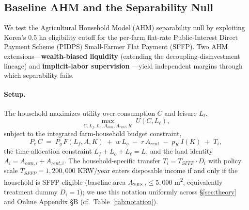 \documentclass[12pt, a4paper]{article}
\begin{document}
\subsection{Baseline AHM and the Separability Null}
\label{sec:ahm-baseline}

We test the \citet{SinghSquireStrauss1986_ahm} Agricultural Household Model (AHM) separability null by exploiting Korea's 0.5 ha eligibility cutoff for the per-farm flat-rate Public-Interest Direct Payment Scheme (PIDPS) Small-Farmer Flat Payment (SFFP). Two AHM extensions---\textbf{wealth-biased liquidity} \citep{CarterOlinto2003_liquidity} (extending the \citealp{Kazukauskas2013_disinvestment} decoupling-disinvestment lineage) and \textbf{implicit-labor supervision} \citep{EswaranKotwal1986_supervision}---yield independent margins through which separability fails.

\paragraph{Setup.} The household maximizes utility over consumption $C$ and leisure $L_\ell$,
\begin{equation}
\max_{C, L_f, L_o, A_{own}, A_{rent}, K} \; U(C, L_\ell),
\label{eq:ahm-objective}
\end{equation}
subject to the integrated farm-household budget constraint,
\begin{equation}
P_c\, C \;=\; P_q\, F(L_f, A, K) \;+\; w\, L_o \;-\; r\, A_{rent} \;-\; p_K\, I(K) \;+\; T_i,
\label{eq:ahm-budget}
\end{equation}
the time-allocation constraint $L_f + L_o + L_\ell = \bar L$, and the land identity $A_i = A_{own,i} + A_{rent,i}$. The household-specific transfer $T_i = T_{SFFP} \cdot D_i$ with policy scale $T_{SFFP} = 1{,}200{,}000$ KRW/year enters disposable income if and only if the household is SFFP-eligible (baseline area $A_{2018,i} \le 5{,}000$ m\textsuperscript{2}, equivalently treatment dummy $D_i = 1$); we use this notation uniformly across \S\ref{sec:theory} and Online Appendix \S B (cf.\ Table~\ref{tab:notation}).
\end{document}
